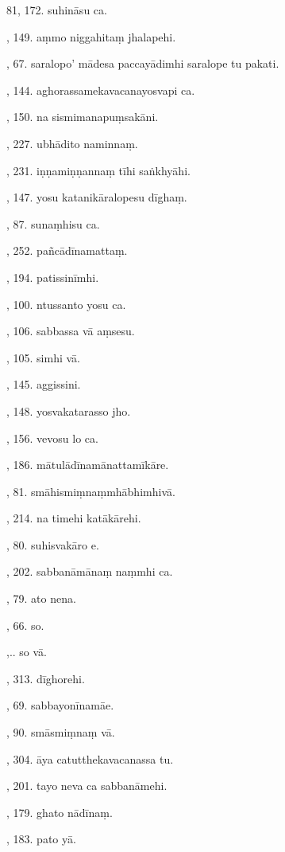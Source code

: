81, 172. suhināsu ca.\par {}, 149. aṃmo niggahitaṃ jhalapehi.\par {}, 67. saralopo’ mādesa paccayādimhi saralope tu pakati.\par {}, 144. aghorassamekavacanayosvapi ca.\par {}, 150. na sismimanapuṃsakāni.\par {}, 227. ubhādito naminnaṃ.\par {}, 231. iṇṇamiṇṇannaṃ tīhi saṅkhyāhi.\par {}, 147. yosu katanikāralopesu dīghaṃ.\par {}, 87. sunaṃhisu ca.\par {}, 252. pañcādīnamattaṃ.\par {}, 194. patissinīmhi.\par {}, 100. ntussanto yosu ca.\par {}, 106. sabbassa vā aṃsesu.\par {}, 105. simhi vā.\par {}, 145. aggissini.\par {}, 148. yosvakatarasso jho.\par {}, 156. vevosu lo ca.\par {}, 186. mātulādīnamānattamīkāre.\par {}, 81. smāhismiṃnaṃmhābhimhivā.\par {}, 214. na timehi katākārehi.\par {}, 80. suhisvakāro e.\par {}, 202. sabbanāmānaṃ naṃmhi ca.\par {}, 79. ato nena.\par {}, 66. so.\par {},.. so vā.\par {}, 313. dīghorehi.\par {}, 69. sabbayonīnamāe.\par {}, 90. smāsmiṃnaṃ vā.\par {}, 304. āya catutthekavacanassa tu.\par {}, 201. tayo neva ca sabbanāmehi.\par {}, 179. ghato nādīnaṃ.\par {}, 183. pato yā.\par \noindent
